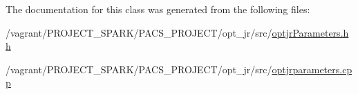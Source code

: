 The documentation for this class was generated from the following files\-:\begin{DoxyCompactItemize}
\item 
/vagrant/\-P\-R\-O\-J\-E\-C\-T\-\_\-\-S\-P\-A\-R\-K/\-P\-A\-C\-S\-\_\-\-P\-R\-O\-J\-E\-C\-T/opt\-\_\-jr/src/\hyperlink{optjrParameters_8hh}{optjr\-Parameters.\-hh}\item 
/vagrant/\-P\-R\-O\-J\-E\-C\-T\-\_\-\-S\-P\-A\-R\-K/\-P\-A\-C\-S\-\_\-\-P\-R\-O\-J\-E\-C\-T/opt\-\_\-jr/src/\hyperlink{optjrparameters_8cpp}{optjrparameters.\-cpp}\end{DoxyCompactItemize}
